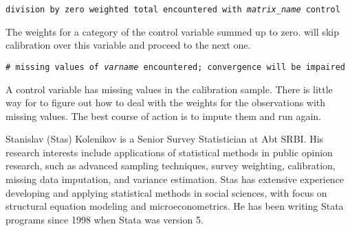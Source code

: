     \noindent
    {\tt division by zero weighted total encountered with 
    {\it matrix{\_}name} control}

    \morehang
    The weights for a category of the control variable summed up
    to zero.  will skip calibration over this
    variable and proceed to the next one.

    \noindent
    {\tt \# missing values of {\it varname} encountered; convergence will be impaired}

    \morehang
    A control variable has missing values in the calibration sample. 
    There is little way for  to figure out how to deal
    with the weights for the observations with missing values. The best course
    of action is to impute them and run  again.





% 


\begin{aboutauthor}
  Stanislav (Stas) Kolenikov is a Senior Survey Statistician at Abt SRBI.
  His research interests include
  applications of statistical methods in public opinion research,
  such as advanced sampling techniques, survey weighting,
  calibration, missing data imputation, and variance estimation.
  Stas has extensive experience developing and applying
  statistical methods in social sciences, with focus on structural equation
  modeling and microeconometrics. He has been writing Stata programs since
  1998 when Stata was version 5.
\end{aboutauthor}
